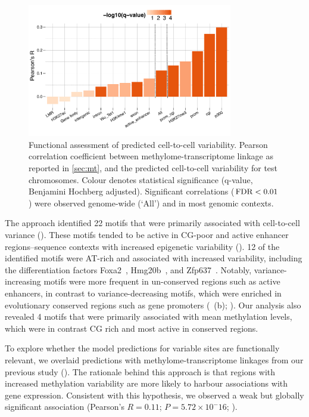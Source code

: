 \begin{figure}[htbp!]
\centering
\includegraphics[width=0.8\textwidth]{var_mt}
\caption[Functional assessment of predicted cell-to-cell variability.]{Functional assessment of predicted cell-to-cell variability. Pearson correlation coefficient between methylome-transcriptome linkage as reported in \cref{sec:mt}, and the predicted cell-to-cell variability for test chromosomes. Colour denotes statistical significance (q-value, Benjamini Hochberg adjusted). Significant correlations ($\operatorname{FDR}<0.01$) were observed  genome-wide (`All') and in most genomic contexts.}
\label{fig:dcpg_var_mt}
\end{figure}

The approach identified 22 motifs that were primarily associated with cell-to-cell variance (). These motifs tended to be active in CG-poor and active enhancer regions--sequence contexts with increased epigenetic variability (). 12 of the identified motifs were AT-rich and associated with increased variability, including the differentiation factors Foxa2~\citep{lee_foxa2_2005,wan_compensatory_2005}, Hmg20b~\citep{sumoy_hmg20a_2000}, and Zfp637~\citep{huang_il-6_2016,quenneville_embryonic_2011}. Notably, variance-increasing motifs were more frequent in un-conserved regions such as active enhancers, in contrast to variance-decreasing motifs, which were enriched in evolutionary conserved regions such as gene promoters (~(b); ). Our analysis also revealed 4 motifs that were primarily associated with mean methylation levels, which were in contrast CG rich and most active in conserved regions.

To explore whether the model predictions for variable sites are functionally relevant, we overlaid predictions with methylome-transcriptome linkages from our previous study (). The rationale behind this approach is that regions with increased methylation variability are more likely to harbour associations with gene expression. Consistent with this hypothesis, we observed a weak but globally significant association (Pearson's $R=0.11$; $P=5.72\times10^-16$; ).

